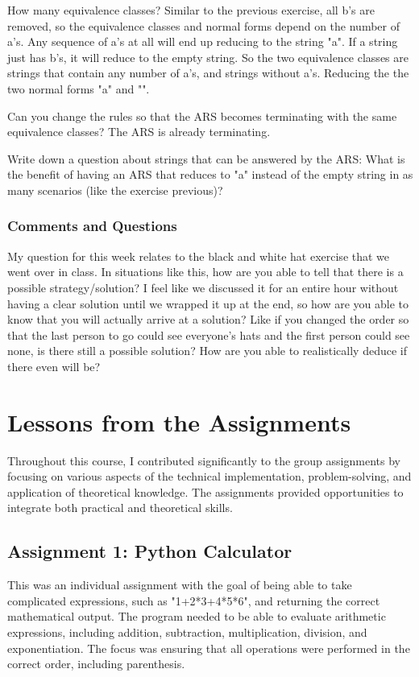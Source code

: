 \documentclass{article}
\theoremstyle{theorem}
\theoremstyle{definition}
\theoremstyle{remark}
\begin{document}
How many equivalence classes?
Similar to the previous exercise, all b's are removed, so the equivalence 
classes and normal forms depend on the number of a's. Any sequence of a's at all will 
end up reducing to the string "a". If a string just has b's, it will reduce to the 
empty string. So the two equivalence classes are strings that contain any number of 
a's, and strings without a's. Reducing the the two normal forms "a" and "".

Can you change the rules so that the ARS becomes terminating with 
the same equivalence classes?
The ARS is already terminating.

Write down a question about strings that can be answered by the ARS:
What is the benefit of having an ARS that reduces to "a" instead of the empty 
string in as many scenarios (like the exercise previous)? 
\subsubsection*{Comments and Questions}
My question for this week relates to the black and white hat exercise that we 
went over in class. In situations like this, how are you able to tell that there is a 
possible strategy/solution? I feel like we discussed it for an entire hour without having a clear
solution until we wrapped it up at the end, so how are you able to know that you will actually 
arrive at a solution? Like if you changed the order so that the last person to go could see 
everyone's hats and the first person could see none, is there still a possible solution? How 
are you able to realistically deduce if there even will be? 
\section{Lessons from the Assignments}
Throughout this course, I contributed significantly to the group assignments by focusing on various 
aspects of the technical implementation, problem-solving, and application of theoretical knowledge. 
The assignments provided opportunities to integrate both practical and theoretical skills.
\subsection*{Assignment 1: Python Calculator}
This was an individual assignment with the goal of being able to take complicated 
expressions, such as "1+2*3+4*5*6", and returning the correct mathematical output. 
The program needed to be able to evaluate arithmetic expressions, including addition,
subtraction, multiplication, division, and exponentiation. The focus was ensuring that 
all operations were performed in the correct order, including parenthesis. 
\end{document}
